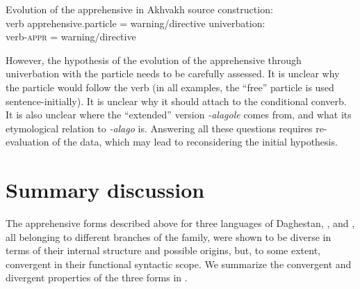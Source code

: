 \documentclass[output=paper,colorlinks,citecolor=brown]{langscibook}
\begin{document}
\ea \label{ex:DD78} \textnormal{Evolution of the apprehensive in Akhvakh}
\ea \label{ex:DD78a} \textnormal{source construction:} \\
\textnormal{{\ob}verb apprehensive.particle{\cb} = warning/directive}
\ex \label{ex:DD78b} \textnormal{univerbation:} \\
\textnormal{{\ob}verb-\textsc{appr}{\cb} = warning/directive}
\z
\z

 However, the hypothesis of the evolution of the apprehensive through univerbation with the particle needs to be carefully assessed. It is unclear why the particle would follow the verb (in all examples, the ``free'' particle is used sentence-initially). It is unclear why it should attach to the conditional converb. It is also unclear where the ``extended'' version \textit{-alagole} comes from, and what its etymological relation to \textit{-alago} is. Answering all these questions requires re-evaluation of the data, which may lead to reconsidering the initial hypothesis.



\section{Summary discussion}
\label{daniel:summary}
 
The apprehensive forms described above for three languages of Daghestan, ,  and , all belonging to different branches of the family, were shown to be diverse in terms of their internal structure and possible origins, but, to some extent, convergent in their functional syntactic scope. We summarize the convergent and divergent properties of the three forms in .
 
\end{document}
